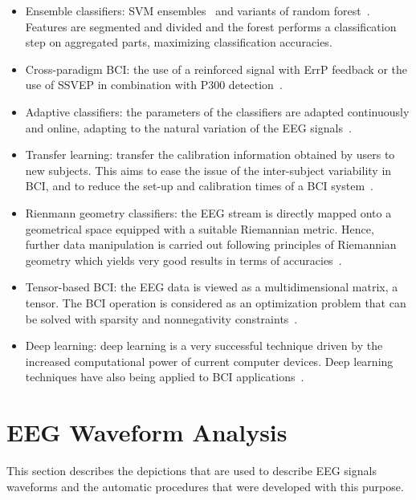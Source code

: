 \begin{itemize}
\item Ensemble classifiers: SVM ensembles~\cite{Rakotomamonjy2008} and variants of random forest~\cite{Steyrl2015}.  Features are segmented and divided and the forest performs a classification step on aggregated parts, maximizing classification accuracies.
\item Cross-paradigm BCI: the use of a reinforced signal with ErrP feedback or the use of SSVEP in combination with P300 detection~\cite{Lotte2018}.
\item Adaptive classifiers: the parameters of the classifiers are adapted continuously and online,  adapting to the natural variation of the EEG signals~\cite{Lotte2018}.
\item Transfer learning: transfer the calibration information obtained by users to new subjects.  This aims to ease the issue of the inter-subject variability in BCI, and to reduce the set-up and calibration times of a BCI system~\cite{Zanini2018}.
\item Rienmann geometry classifiers: the EEG stream is directly mapped onto a geometrical space equipped with a suitable Riemannian metric.  Hence, further data manipulation is carried out following principles of Riemannian geometry which yields very good results in terms of accuracies~\cite{Zanini2018}.
\item Tensor-based BCI:  the EEG data is viewed as a multidimensional matrix, a tensor.  The BCI operation is considered as an optimization problem that can be solved with sparsity and nonnegativity constraints~\cite{Vincent2010,Cichocki2008}.
\item Deep learning: deep learning is a very successful technique driven by the increased computational power of current computer devices.  Deep learning techniques have also being applied to BCI applications~\cite{Tjepkema-Cloostermans2018}.
\end{itemize}


\section{EEG Waveform Analysis}

This section describes the depictions that are used to describe EEG signals waveforms and the automatic procedures that were developed with this purpose.

